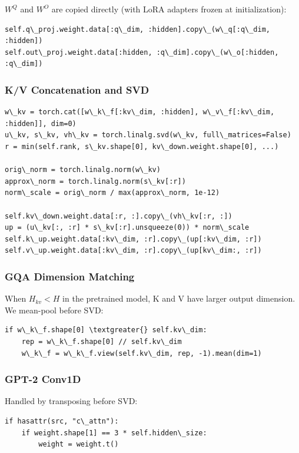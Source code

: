 $W^Q$ and $W^O$ are copied directly (with LoRA adapters frozen at 
initialization):

\begin{lstlisting}
self.q\_proj.weight.data[:q\_dim, :hidden].copy\_(w\_q[:q\_dim, :hidden])
self.out\_proj.weight.data[:hidden, :q\_dim].copy\_(w\_o[:hidden, :q\_dim])
\end{lstlisting}

\subsubsection{K/V Concatenation and SVD}

\begin{lstlisting}
w\_kv = torch.cat([w\_k\_f[:kv\_dim, :hidden], w\_v\_f[:kv\_dim, :hidden]], dim=0)
u\_kv, s\_kv, vh\_kv = torch.linalg.svd(w\_kv, full\_matrices=False)
r = min(self.rank, s\_kv.shape[0], kv\_down.weight.shape[0], ...)

orig\_norm = torch.linalg.norm(w\_kv)
approx\_norm = torch.linalg.norm(s\_kv[:r])
norm\_scale = orig\_norm / max(approx\_norm, 1e-12)

self.kv\_down.weight.data[:r, :].copy\_(vh\_kv[:r, :])
up = (u\_kv[:, :r] * s\_kv[:r].unsqueeze(0)) * norm\_scale
self.k\_up.weight.data[:kv\_dim, :r].copy\_(up[:kv\_dim, :r])
self.v\_up.weight.data[:kv\_dim, :r].copy\_(up[kv\_dim:, :r])
\end{lstlisting}

\subsubsection{GQA Dimension Matching}

When $H_{kv} < H$ in the pretrained model, K and V have larger output 
dimension. We mean-pool before SVD:

\begin{lstlisting}
if w\_k\_f.shape[0] \textgreater{} self.kv\_dim:
    rep = w\_k\_f.shape[0] // self.kv\_dim
    w\_k\_f = w\_k\_f.view(self.kv\_dim, rep, -1).mean(dim=1)
\end{lstlisting}

\subsubsection{GPT-2 Conv1D}

Handled by transposing before SVD:

\begin{lstlisting}
if hasattr(src, "c\_attn"):
    if weight.shape[1] == 3 * self.hidden\_size:
        weight = weight.t()
\end{lstlisting}

